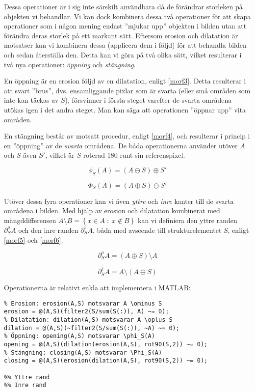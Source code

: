 \documentclass[../rapport_MVEX01-11-05]{subfiles}
\begin{document}
Dessa operationer är i sig inte särskilt användbara då de förändrar
storleken på objekten vi behandlar. Vi kan dock kombinera dessa två
operationer för att skapa operationer som i någon mening endast 
''mjukar upp'' objekten i bilden utan att förändra deras storlek på
ett markant sätt. Eftersom erosion och dilatation är motsatser kan vi
kombinera dessa (applicera dem i följd) för att behandla bilden och
sedan återställa den. Detta kan vi göra på två olika sätt, vilket
resulterar i två nya operationer: \emph{öppning} och \emph{stängning}.

En öppning är en erosion följd av en dilatation, enligt \eqref{morf3}.
Detta resulterar i att svart ''brus'', dvs. ensamliggande pixlar som
är svarta (eller små områden som inte kan täckas av $S$), försvinner i
första steget varefter de svarta områdena utökas igen i det andra
steget. Man kan säga att operationen ''öppnar upp'' vita områden.

En stängning består av motsatt procedur, enligt \eqref{morf4}, och
resulterar i princip i en ''öppning'' av de \emph{svarta} områdena. De
båda operationerna använder utöver $A$ och $S$ även $S'$, vilket är
$S$ roterad 180\textdegree{} runt sin referenspixel.

\begin{equation}
  \label{morf3}
  \phi_S(A)=(A\ominus S)\oplus S'
\end{equation}

\begin{equation}
  \label{morf4}
  \Phi_S(A)=(A\oplus S)\ominus S'
\end{equation}

Utöver dessa fyra operationer kan vi även \emph{yttre} och \emph{inre}
kanter till de svarta områdena i bilden. Med hjälp av erosion och
dilatation kombinerat med mängddifferensen $A\setminus B=\left\{x\in
A\;:\;x\not\in B\right\}$ kan vi definiera den yttre randen
$\partial_S^o A$ och den inre randen $\partial_S^i A$, båda med
avseende till strukturelementet $S$, enligt \eqref{morf5} och
\eqref{morf6}.

\begin{equation}
  \label{morf5}
  \partial_S^o A = \left(A\oplus S\right)\setminus A
\end{equation}

\begin{equation}
  \label{morf6}
  \partial_S^i A = A\setminus\left(A\ominus S\right)
\end{equation}

Operationerna är relativt enkla att implementera i MATLAB:

\begin{verbatim}
% Erosion: erosion(A,S) motsvarar A \ominus S
erosion = @(A,S)(filter2(S/sum(S(:)), A) ~= 0);
% Dilatation: dilation(A,S) motsvarar A \oplus S
dilation = @(A,S)(~filter2(S/sum(S(:)), ~A) ~= 0);
% Öppning: opening(A,S) motsvarar \phi_S(A)
opening = @(A,S)(dilation(erosion(A,S), rot90(S,2)) ~= 0);
% Stängning: closing(A,S) motsvarar \Phi_S(A)
closing = @(A,S)(erosion(dilation(A,S), rot90(S,2)) ~= 0);

%% Yttre rand
%% Inre rand
\end{verbatim}

\end{document}
